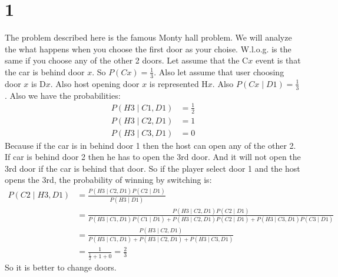 \section*{1}
The problem described here is the famous Monty hall problem.
We will analyze the what happens when you choose the first door as
your choise. W.l.o.g. is the same if you choose any of the other 2 doors.
Let assume that the C$x$ event is that the car is behind door $x$.
So $P(Cx) = \frac{1}{3}$. Also let assume that user choosing door $x$ is D$x$.
Also host opening door $x$ is represented H$x$. Also $P(Cx\mid D1) = \frac{1}{3}$.
Also we have the probabilities:
\begin{align*}
P(H3\mid C1,D1) &= \frac{1}{2}\\
P(H3\mid C2,D1) &= 1\\
P(H3\mid C3,D1) &= 0
\end{align*}
Because if the car is in behind door 1 then the host can open any of the other 2.
If car is behind door 2 then he has to open the 3rd door. And it will not open the 
3rd door if the car is behind that door. So if the player select door 1 and the host
opens the 3rd, the probability of winning by switching is:
\begin{align*}
P(C2\mid H3,D1) &= \frac{P(H3\mid C2,D1) P(C2\mid D1)}{P(H3\mid D1)}\\
&= \frac{P(H3\mid C2,D1) P(C2\mid D1)}{P(H3\mid C1,D1) P(C1\mid D1) + P(H3\mid C2,D1) P(C2\mid D1) + P(H3\mid C3,D1) P(C3\mid D1)}\\
&= \frac{P(H3\mid C2,D1)}{P(H3\mid C1,D1) + P(H3\mid C2,D1) + P(H3\mid C3,D1)}\\
&= \frac{1}{\frac{1}{2} + 1 + 0} = \frac{2}{3}
\end{align*}
So it is better to change doors.
